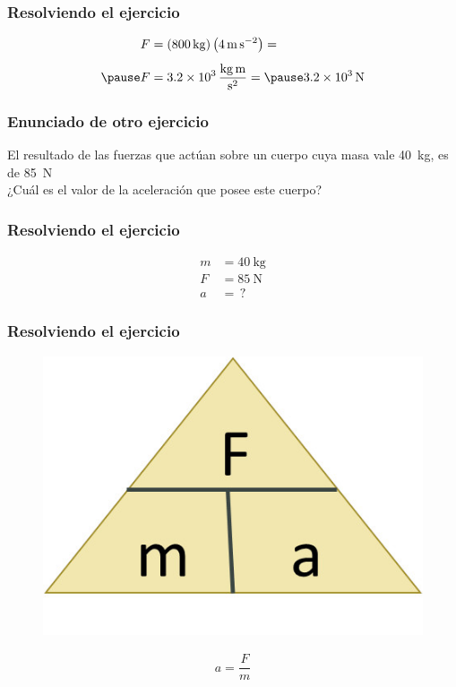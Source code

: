 \documentclass[14pt]{beamer}
\begin{document}
\begin{frame}
\frametitle{Resolviendo el ejercicio}
\pause
\begin{eqnarray*}
\begin{aligned}
F &= \left( \SI{800}{\kilo\gram} \right) \left( \SI{4}{\meter\per\square\second} \right) = \\[0.5em] \pause
F &= \SI[per-mode=fraction]{3.2d3}{\kilo\gram\meter\per\square\second} = \pause \SI{3.2d3}{\newton}
\end{aligned}
\end{eqnarray*}
\end{frame}    
\begin{frame}
\frametitle{Enunciado de otro ejercicio}
El resultado de las fuerzas que actúan sobre un cuerpo cuya masa vale \SI{40}{\kilo\gram}, es de \SI{85}{\newton}
\\
\bigskip
¿Cuál es el valor de la aceleración que posee este cuerpo?
\end{frame}
\begin{frame}
\frametitle{Resolviendo el ejercicio}
\pause
\begin{align*}
m &= \SI{40}{\kilo\gram} \\[0.5em]
F &= \SI{85}{\newton} \\[0.5em]
a &= \, ?
\end{align*}
\end{frame}
\begin{frame}
\frametitle{Resolviendo el ejercicio}
\pause
\begin{figure}
    \centering
    \includegraphics[scale=1]{Imagenes/Newton_11.jpg}
\end{figure}
\pause
\begin{align*}
a = \dfrac{F}{m}
\end{align*}
\end{frame}
\end{document}
